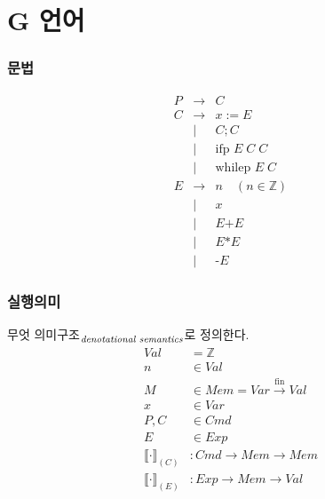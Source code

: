 \documentclass{simplesnt}
\newcommand{\textalt}[2]{#1\textsubscript{\ensuremath{\text{\scriptsize\textit{#2}}}}}
\begin{document}
\section{G 언어}
\begin{frame}
  \frametitle{문법}
  \[
    \begin{array}{rcl}
      P & \rightarrow & C \\[1em]
      C & \rightarrow & x := E \\
        & \mid & C ; C \\
        & \mid & \text{ifp } E \; C \; C \\
        & \mid & \text{whilep } E \; C \\[1em]
      E & \rightarrow & n \quad (n \in \mathbb{Z}) \\
        & \mid & x \\
        & \mid & E \text{+} E \\
        & \mid & E \text{*} E \\
        & \mid & \text{-}E
    \end{array}
  \]
\end{frame}

\begin{frame}
  \frametitle{실행의미}
  \textalt{무엇 의미구조}{denotational semantics}로 정의한다.
  \begin{align*}
    Val &= \mathbb{Z} \\
    n &\in Val \\
    M &\in Mem = Var \xrightarrow{\text{fin}} Val \\
    x &\in Var \\
    P, C &\in Cmd \\
    E &\in Exp \\
    \llbracket \cdot \rrbracket_{(C)} &: Cmd \rightarrow Mem \rightarrow Mem \\
    \llbracket \cdot \rrbracket_{(E)} &: Exp \rightarrow Mem \rightarrow Val
  \end{align*}
\end{frame}
\end{document}

